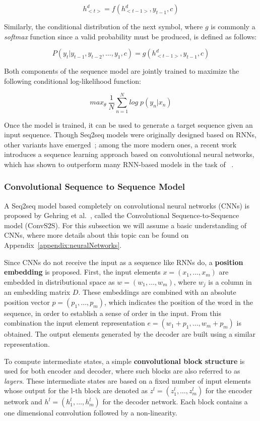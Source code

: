 \[
    h_{<t>}^d= f(h_{<t-1>}^d,y_{t-1},c)
\]

Similarly, the conditional distribution of the next symbol, where $g$ is commonly a 
\textit{softmax} function since a valid probability must be produced, is defined as follows:

\[
    P(y_t|y_{t-1},y_{t-2},\ldots,y_1,c) = g(h_{<t-1>}^d,y_{t-1},c)
\]

Both components of the sequence model are jointly trained to maximize the following 
conditional log-likelihood function:

\[
    max_{\theta} \: \frac{1}{N} \sum_{n=1}^N log \; p(y_n|x_n)
\]

Once the model is trained, it can be used to generate a target sequence given an input 
sequence. Though Seq2seq models were originally designed based on RNNs, other variants have 
emerged~\cite{semPar:SutskeverVL14,nmt:DongL16}; among the more modern ones, a recent work 
introduces a sequence learning approach based on convolutional neural networks, which has 
shown to outperform many RNN-based models in the task of \NLtoSPARQL~\cite{nmt:nl-to-sparql-Yin19}.

\subsubsection{Convolutional Sequence to Sequence Model}
\label{cap2:theoFrame/semPar/seq2seq/convS2S}
A Seq2seq model based completely on convolutional neural networks (CNNs) is 
proposed by Gehring et al.~\cite{nmt:convS2S-GehringAGYD17}, called the Convolutional 
Sequence-to-Sequence model (ConvS2S). For this subsection we will assume a basic 
understanding of CNNs, where more details about this topic can be found on 
Appendix~\ref{appendix:neuralNetworks}.

Since CNNs do not receive the input as a sequence like RNNs do, a \textbf{position embedding} 
is proposed. First, the input elements $x=(x_1,\ldots,x_m)$ are embedded in distributional 
space as $w=(w_1,\ldots,w_m)$, where $w_j$ is a column in an embedding matrix $D$. These 
embeddings are combined with an absolute position vector $p=(p_1,\ldots, p_m)$, which 
indicates the position of the word in the sequence, in order to establish a sense of order in 
the input. From this combination the input element representation $e=(w_1+p_1,\ldots, w_m+p_m)$ 
is obtained. The output elements generated by the decoder are built using a similar 
representation.

To compute intermediate states, a simple \textbf{convolutional block structure} is used for both 
encoder and decoder, where such blocks are also referred to as \textit{layers}. These intermediate 
states are based on a fixed number of input elements whose output for the l-th block are 
denoted as $z^l=(z_1^l,\ldots,z_m^l)$ for the encoder network and $h^l=(h_1^l,\ldots,h_m^l)$ 
for the decoder network. Each block contains a one dimensional convolution followed by a 
non-linearity.

